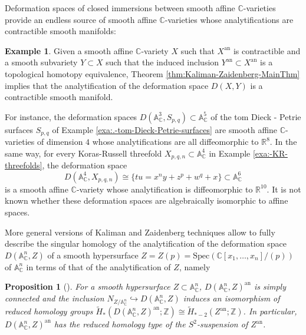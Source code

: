 \documentclass[10pt]{alggeom}
\newtheorem{propo}[thm]{Proposition}
\theoremstyle{definition}
\newtheorem{ex}[thm]{Example}
\numberwithin{equation}{section}
\begin{document}
Deformation spaces of closed immersions between smooth affine $\mathbb{C}$-varieties
provide an endless source of smooth affine $\mathbb{C}$-varieties
whose analytifications are contractible smooth manifolds: 
\begin{ex}
Given a smooth affine $\mathbb{C}$-variety $X$ such that $X^{\mathrm{an}}$
is contractible and a smooth subvariety $Y\subset X$ such that the
induced inclusion $Y^{\mathrm{an}}\subset X^{\mathrm{an}}$ is a topological
homotopy equivalence, Theorem \ref{thm:Kaliman-Zaidenberg-MainThm}
implies that the analytification of the deformation space $D(X,Y)$
is a contractible smooth manifold. 

For instance, the deformation spaces $D(\mathbb{A}_{\mathbb{C}}^{3},S_{p,q})\subset\mathbb{A}_{\mathbb{C}}^{5}$
of the tom Dieck - Petrie surfaces $S_{p,q}$ of Example \ref{exa:.-tom-Dieck-Petrie-surfaces}
are smooth affine $\mathbb{C}$-varieties of dimension $4$ whose
analytifications are all diffeomorphic to $\mathbb{R}^{8}$. In the
same way, for every Koras-Russell threefold $X_{p,q,n}\subset\mathbb{A}_{\mathbb{C}}^{4}$
in Example \ref{exa:-KR-threefolds}, the deformation space 
\[
D(\mathbb{A}_{\mathbb{C}}^{4},X_{p,q,n})\cong\{tu=x^{n}y+z^{p}+w^{q}+x\}\subset\mathbb{A}_{\mathbb{C}}^{6}
\]
is a smooth affine $\mathbb{C}$-variety whose analytification is
diffeomorphic to $\mathbb{R}^{10}$. It is not known whether these
deformation spaces are algebraically isomorphic to affine spaces. 
\end{ex}

More general versions of Kaliman and Zaidenberg techniques allow to
fully describe the singular homology of the analytification of the
deformation space $D(\mathbb{A}_{\mathbb{C}}^{n},Z)$ of a smooth
hypersurface $Z=Z(p)=\mathrm{Spec}(\mathbb{C}[x_{1},\ldots,x_{n}]/(p))$
of $\mathbb{A}_{\mathbb{C}}^{n}$ in terms of that of the analytification
of $Z$, namely 
\begin{propo}[{\cite[Proposition 4.1]{KZ99}}]
\label{prop:Homology-type-Def-space}For a smooth hypersurface $Z\subset\mathbb{A}_{\mathbb{C}}^{n}$,
$D(\mathbb{A}_{\mathbb{C}}^{n},Z)^{\mathrm{an}}$ is simply connected
and the inclusion $N_{Z/\mathbb{A}_{\mathbb{C}}^{n}}\hookrightarrow D(\mathbb{A}_{\mathbb{C}}^{n},Z)$
induces an isomorphism of reduced homology groups $\tilde{H}_{*}(D(\mathbb{A}_{\mathbb{C}}^{n},Z)^{\mathrm{an}};\mathbb{Z})\cong\tilde{H}_{*-2}(Z^{\mathrm{an}};\mathbb{Z})$. 
In particular, $D(\mathbb{A}_{\mathbb{C}}^{n},Z)^{\mathrm{an}}$ has
the reduced homology type of the $S^{2}$-suspension of $Z^{\mathrm{an}}$. 
\end{propo}
\end{document}
